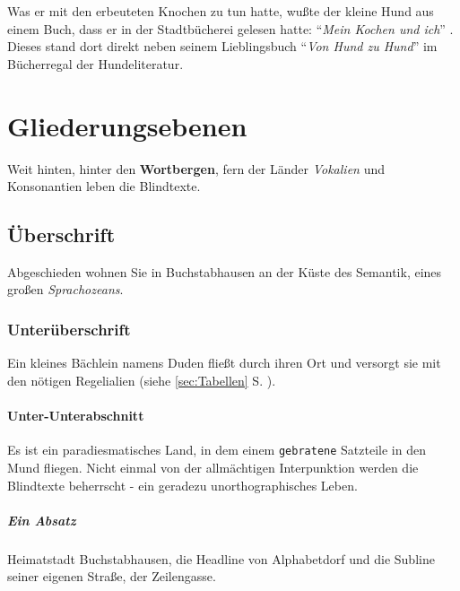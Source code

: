 \documentclass[%
	12pt,%
	a4paper,%
	oneside,%
	listof=totoc,
 	index=totoc,
	bibliography = totoc,
	parskip = half,%
	chapterprefix=false,%
	appendixprefix, %
	headings=small,%
]{scrreprt}
\begin{document}
Was er mit den erbeuteten Knochen zu tun hatte, wußte der kleine Hund aus einem Buch, dass er in der Stadtbücherei
gelesen hatte: "`\emph{Mein Kochen und ich}"' \cite{ansorge_1999}. Dieses stand dort direkt neben seinem Lieblingsbuch
"`\emph{Von Hund zu Hund}"' \cite{balzert_SWT1} im Bücherregal der Hundeliteratur.


\chapter{Gliederungsebenen}
\label{sec:Gliederung}

Weit hinten, hinter den \textbf{Wortbergen}, fern der Länder \textit{Vokalien} und Konsonantien leben die Blindtexte.

\section{Überschrift}

Abgeschieden wohnen Sie in Buchstabhausen an der Küste des Semantik, eines großen \textsl{Sprachozeans}.

\subsection{Unterüberschrift}

Ein kleines Bächlein namens Duden fließt durch ihren Ort und versorgt sie mit den nötigen Regelialien (siehe \ref{sec:Tabellen} S. \pageref{sec:Tabellen}).

\subsubsection{Unter-Unterabschnitt}

Es ist ein paradiesmatisches Land, in dem einem \texttt{gebratene} Satzteile in den Mund fliegen. Nicht einmal von der allmächtigen Interpunktion werden die Blindtexte beherrscht - ein geradezu unorthographisches Leben.

\paragraph{Ein Absatz}
Heimatstadt Buchstabhausen, die Headline von Alphabetdorf und die Subline seiner eigenen Straße, der Zeilengasse.
\end{document}
